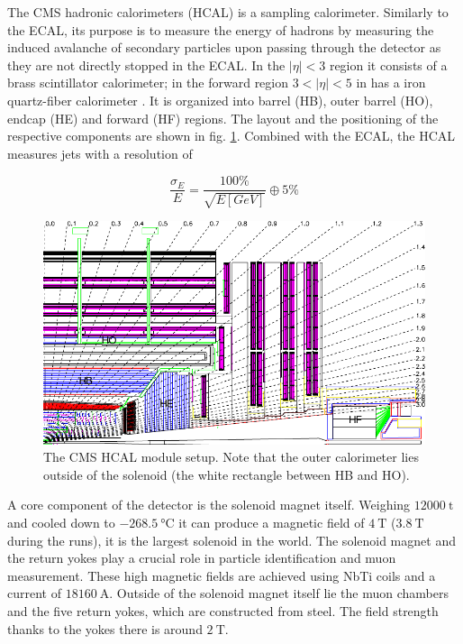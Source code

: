 

The CMS hadronic calorimeters (HCAL) is a sampling calorimeter. Similarly to the ECAL, its purpose is to measure the energy of hadrons by measuring the induced avalanche of secondary particles upon passing through the detector as they are not directly stopped in the ECAL. In the $|\eta|<3$ region it consists of a brass scintillator calorimeter; in the forward region $3<|\eta|<5$ in has a iron quartz-fiber calorimeter \cite{canko_ak_2009}. It is organized into barrel (HB), outer barrel (HO), endcap (HE) and forward (HF) regions. The layout and the positioning of the respective components are shown in fig. \ref{fig:hcal}. Combined with the ECAL, the HCAL measures jets with a resolution of \cite{Lopez}

\begin{equation*}
	\frac{\sigma_E}{E} = \frac{100\%}{\sqrt{E\left[GeV\right]}} \oplus 5\%
\end{equation*}

\begin{figure}[h!]
	\centering
	\includegraphics[width=0.8\linewidth]{figures/experiment/hcal.pdf}
	\caption{The CMS HCAL module setup. Note that the outer calorimeter lies outside of the solenoid (the white rectangle between HB and HO). \cite{Chatrchyan:1129810}}
	\label{fig:hcal}
\end{figure}


A core component of the detector is the solenoid magnet itself. Weighing $\SI{12000}{\tonne}$ and cooled down to $\SI{-268.5}{\degreeCelsius}$ it can produce a magnetic field of $\SI{4}{\tesla}$ ($\SI{3.8}{\tesla}$ during the runs), it is the largest solenoid in the world. The solenoid magnet and the return yokes play a crucial role in particle identification and muon measurement. These high magnetic fields are achieved using NbTi coils and a current of $\SI{18160}{\ampere}$. Outside of the solenoid magnet itself lie the muon chambers and the five return yokes, which are constructed from steel. The field strength thanks to the yokes there is around $\SI{2}{\tesla}$.

